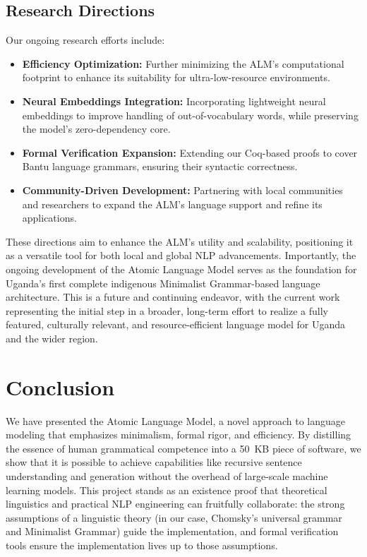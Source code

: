 \documentclass[11pt]{article}
\begin{document}
\subsection*{Research Directions}
Our ongoing research efforts include:
\begin{itemize}
    \item \textbf{Efficiency Optimization:} Further minimizing the ALM's computational footprint to enhance its suitability for ultra-low-resource environments.
    \item \textbf{Neural Embeddings Integration:} Incorporating lightweight neural embeddings to improve handling of out-of-vocabulary words, while preserving the model's zero-dependency core.
    \item \textbf{Formal Verification Expansion:} Extending our Coq-based proofs to cover Bantu language grammars, ensuring their syntactic correctness.
    \item \textbf{Community-Driven Development:} Partnering with local communities and researchers to expand the ALM's language support and refine its applications.
\end{itemize}
These directions aim to enhance the ALM's utility and scalability, positioning it as a versatile tool for both local and global NLP advancements. Importantly, the ongoing development of the Atomic Language Model serves as the foundation for Uganda's first complete indigenous Minimalist Grammar-based language architecture. This is a future and continuing endeavor, with the current work representing the initial step in a broader, long-term effort to realize a fully featured, culturally relevant, and resource-efficient language model for Uganda and the wider region.

\section{Conclusion}
We have presented the Atomic Language Model, a novel approach to language modeling that emphasizes minimalism, formal rigor, and efficiency. By distilling the essence of human grammatical competence into a 50~KB piece of software, we show that it is possible to achieve capabilities like recursive sentence understanding and generation without the overhead of large-scale machine learning models. This project stands as an existence proof that theoretical linguistics and practical NLP engineering can fruitfully collaborate: the strong assumptions of a linguistic theory (in our case, Chomsky's universal grammar and Minimalist Grammar) guide the implementation, and formal verification tools ensure the implementation lives up to those assumptions.
\end{document}
